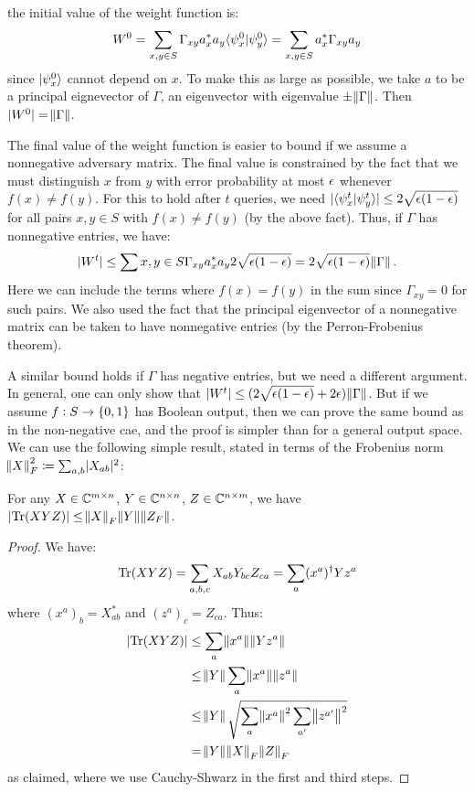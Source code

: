 the initial value of the weight function is:
\begin{equation}
    W^0 = \sum_{x, y \in S}\Gamma_{xy}a^*_x a_y\langle \psi^0_x \lvert \psi^0_y \rangle = \sum_{x, y \in S}a_x^* \Gamma_{xy}a_y
\end{equation}
since $\lvert \psi^0_x \rangle$ cannot depend on $x$. To make this as large as possible, we take $a$ to be a principal eignevector of $\Gamma$, an eigenvector with eigenvalue $\pm \norm{\Gamma}$. Then $\lvert W^0 \rvert = \norm{\Gamma}$. 

The final value of the weight function is easier to bound if we assume a nonnegative adversary matrix. The final value is constrained by the fact that we must distinguish $x$ from $y$ with error probability at most $\epsilon$ whenever $f(x) \neq f(y)$. For this to hold after $t$ queries, we need $\lvert \langle \psi^t_x \lvert \psi^t_y \rangle \rvert \leq 2\sqrt{\epsilon(1-\epsilon)}$ for all pairs $x, y \in S$ with $f(x) \neq f(y)$ (by the above fact). Thus, if $\Gamma$ has nonnegative entries, we have:
\begin{equation}
    \lvert W^t \rvert \leq \sum{x, y \in S}\Gamma_{xy}a_x^*a_y2\sqrt{\epsilon(1-\epsilon)} = 2\sqrt{\epsilon(1-\epsilon)}\norm{\Gamma}.
\end{equation}
Here we can include the terms where $f(x) = f(y)$ in the sum since $\Gamma_{xy} = 0$ for such pairs. We also used the fact that the principal eigenvector of a nonnegative matrix can be taken to have nonnegative entries (by the Perron-Frobenius theorem).


A similar bound holds if $\Gamma$ has negative entries, but we need a different argument. In general, one can only show that $\lvert W^t \rvert \leq (2\sqrt{\epsilon(1-\epsilon)} + 2\epsilon)\norm{\Gamma}$. But if we assume $f: S \rightarrow \set{0, 1}$ has Boolean output, then we can prove the same bound as in the non-negative cae, and the proof is simpler than for a general output space. We can use the following simple result, stated in terms of the Frobenius norm $\norm{X}^2_F \coloneqq \sum_{a, b}\lvert X_{ab} \rvert^2$:

\begin{propbox}{}
    For any $X \in \mathbb{C}^{m \times n}$, $Y \in \mathbb{C}^{n \times n}$, $Z \in \mathbb{C}^{n \times m}$, we have $\lvert \mathrm{Tr}(XYZ) \rvert \leq \norm{X}_F\norm{Y}\norm{Z_F}$.
\end{propbox}
\begin{proof}
    We have:
    \begin{equation}
        \mathrm{Tr}(XYZ) = \sum_{a, b, c}X_{ab}Y_{bc}Z_{ca} = \sum_a(x^a)^\dagger Y z^a
    \end{equation}
    where $(x^a)_b = X^*_{ab}$ and $(z^a)_c = Z_{ca}$. Thus:
    \begin{align*}
        \lvert \mathrm{Tr}(XYZ) \rvert &\leq \sum_a \norm{x^a}\norm{Yz^a}
        \\ &\leq \norm{Y}\sum_a \norm{x^a}\norm{z^a}
        \\ &\leq \norm{Y}\sqrt{\sum_a \norm{x^a}^2\sum_{a'}\norm{z^{a'}}^2}
        \\ &= \norm{Y}\norm{X}_F\norm{Z}_F
    \end{align*}
    as claimed, where we use Cauchy-Shwarz in the first and third steps.
\end{proof}


